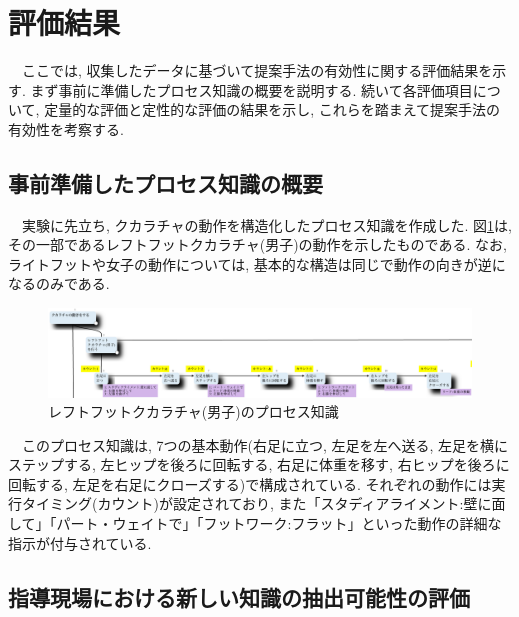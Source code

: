 \section{評価結果}
　ここでは, 収集したデータに基づいて提案手法の有効性に関する評価結果を示す. まず事前に準備したプロセス知識の概要を説明する. 続いて各評価項目について, 定量的な評価と定性的な評価の結果を示し, これらを踏まえて提案手法の有効性を考察する.




\subsection{事前準備したプロセス知識の概要}
　実験に先立ち, クカラチャの動作を構造化したプロセス知識を作成した. 図\ref{fig:process_knowledge_base}は, その一部であるレフトフットクカラチャ(男子)の動作を示したものである. なお, ライトフットや女子の動作については, 基本的な構造は同じで動作の向きが逆になるのみである.\\

\begin{figure}[htbp]
    \centering
    \includegraphics[width=1.0\linewidth]{./image/process_knowledge_base.png}
    \caption{レフトフットクカラチャ(男子)のプロセス知識}
    \label{fig:process_knowledge_base}
\end{figure}

　このプロセス知識は, 7つの基本動作(右足に立つ, 左足を左へ送る, 左足を横にステップする, 左ヒップを後ろに回転する, 右足に体重を移す, 右ヒップを後ろに回転する, 左足を右足にクローズする)で構成されている. それぞれの動作には実行タイミング(カウント)が設定されており, また「スタディアライメント:壁に面して」「パート・ウェイトで」「フットワーク:フラット」といった動作の詳細な指示が付与されている.\\



\subsection{指導現場における新しい知識の抽出可能性の評価}
